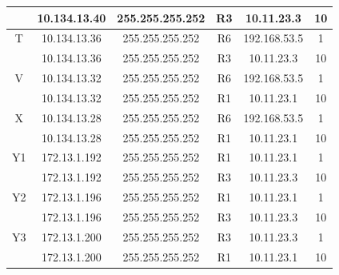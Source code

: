 \documentclass[12pt, a4paper, spanish]{article}
\begin{document}
\begin{center}
\begin{tabular}{|c|c|c|c|c|c|}
	 & 10.134.13.40 & 255.255.255.252 & R3 & 10.11.23.3 & 10\\
	\hline
	T & 10.134.13.36 & 255.255.255.252 & R6 & 192.168.53.5 & 1\\
	 & 10.134.13.36 & 255.255.255.252 & R3 & 10.11.23.3 & 10\\
	\hline
	V & 10.134.13.32 & 255.255.255.252 & R6 & 192.168.53.5 & 1\\
	 & 10.134.13.32 & 255.255.255.252 & R1 & 10.11.23.1 & 10\\
	\hline
	X & 10.134.13.28 & 255.255.255.252 & R6 & 192.168.53.5 & 1\\
	 & 10.134.13.28 & 255.255.255.252 & R1 & 10.11.23.1 & 10\\
	\hline
	Y1 & 172.13.1.192 & 255.255.255.252 & R1 & 10.11.23.1 & 1\\
	 & 172.13.1.192 & 255.255.255.252 & R3 & 10.11.23.3 & 10\\
	\hline
	Y2 & 172.13.1.196 & 255.255.255.252 & R1 & 10.11.23.1 & 1\\
	 & 172.13.1.196 & 255.255.255.252 & R3 & 10.11.23.3 & 10\\
	\hline
	Y3 & 172.13.1.200 & 255.255.255.252 & R3 & 10.11.23.3 & 1\\
	 & 172.13.1.200 & 255.255.255.252 & R1 & 10.11.23.1 & 10\\
	\hline
\end{tabular}
\end{center}
\end{document}
